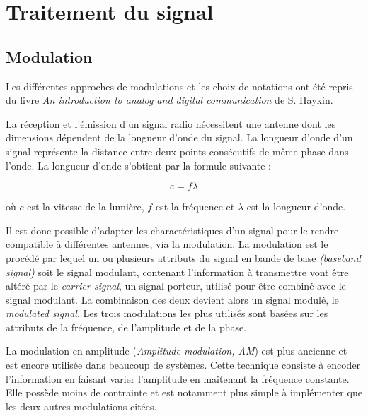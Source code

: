 \section{Traitement du signal}

\subsection{Modulation}\label{mod}

Les différentes approches de modulations et les choix de notations ont été repris du livre \textit{An introduction to analog and digital communication} de S. Haykin\cite{book1}.

\vspace{0.1cm}

La réception et l'émission d'un signal radio nécessitent une antenne dont les dimensions dépendent de la longueur d'onde du signal. La longueur d'onde d'un signal représente la distance entre deux points consécutifs de même phase dans l'onde. La longueur d'onde s'obtient par la formule suivante :

\begin{equation}\label{eq1}
c = f \lambda
\end{equation}

où $c$ est la vitesse de la lumière, $f$ est la fréquence et $\lambda$ est la longueur d'onde.

\vspace{0.1cm}

Il est donc possible d'adapter les charactéristiques d'un signal pour le rendre compatible à différentes antennes, via la modulation. La modulation est le procédé par lequel un ou plusieurs attributs du signal en bande de base \textit{(baseband signal)} soit le signal modulant, contenant l'information à transmettre vont être altéré par le \textit{carrier signal}, un signal porteur, utilisé pour être combiné avec le signal modulant. La combinaison des deux devient alors un signal modulé, le \textit{modulated signal}. Les trois modulations les plus utilisés sont basées sur les attributs de la fréquence, de l'amplitude et de la phase.

\vspace{0.1cm}

La modulation en amplitude (\textit{Amplitude modulation, AM}) est plus ancienne et est encore utilisée dans beaucoup de systèmes. Cette technique consiste à encoder l'information en faisant varier l'amplitude en maitenant la fréquence constante. Elle possède moins de contrainte et est notamment plus simple à implémenter que les deux autres modulations citées.


